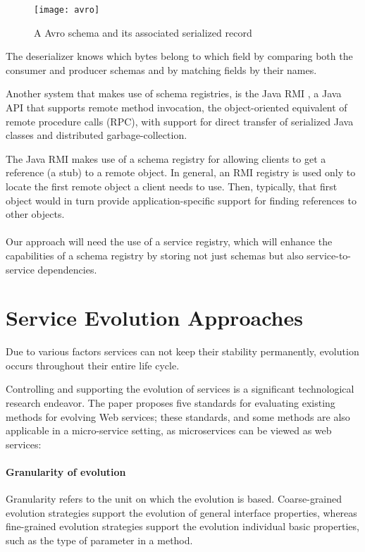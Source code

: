 \begin{figure}[htbp]
    \centering
    \texttt{[image: avro]}
    \caption{A Avro schema and its associated serialized record }
    \label{fig:avro}
\end{figure}

The deserializer knows which bytes belong to which field by comparing both the consumer and producer schemas and by matching fields by their names.

Another system that makes use of schema registries, is the Java RMI \cite{12}, a Java API that supports remote method invocation,
the object-oriented equivalent of remote procedure calls (RPC), with support for direct
transfer of serialized Java classes and distributed garbage-collection.

The Java RMI makes use of a schema registry for allowing clients to get a reference (a stub) to a remote object.
In general, an RMI registry is used only to locate the first remote object a client needs to use.
Then, typically, that first object would in turn provide application-specific support for finding references to other objects.

\paragraph{}

Our approach will need the use of a service registry, which will enhance the capabilities of a schema registry by storing not just schemas but also service-to-service dependencies.

\section{Service Evolution Approaches} %
\label{sec:service_evolution_approaches}

Due to various factors services can not keep their stability
permanently, evolution occurs throughout their entire life cycle.

Controlling and supporting the evolution of services is a significant technological research endeavor.
The paper \cite{17} proposes five standards for evaluating existing methods for evolving Web services;
these standards, and some methods are also applicable in a micro-service setting, as microservices can be viewed as web services:

\paragraph{Granularity of evolution}
Granularity refers to the unit on which the evolution is based.
Coarse-grained evolution strategies support the evolution of general interface properties,
whereas fine-grained evolution strategies support the evolution individual basic properties, such as the type of parameter in a method.

